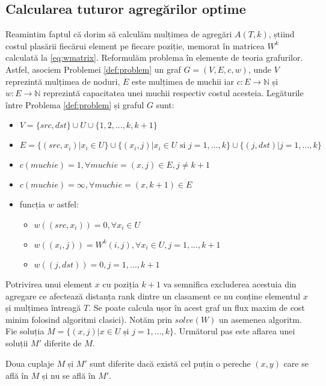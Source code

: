 \subsection{Calcularea tuturor agregărilor optime}
Reamintim faptul că dorim să calculăm mulțimea de agregări $A(T, k)$, știind costul plasării 
fiecărui element pe fiecare poziție, memorat în matricea $W^k$ calculată la \eqref{eq:wmatrix}. 
Reformulăm problema în elemente de teoria grafurilor. Astfel, asociem Problemei \ref{def:problem} 
un graf $G = (V, E, c, w)$, unde $V$ reprezintă mulțimea de noduri, $E$ este mulțimea de muchii iar
$c \colon E \to \mathbb{N}$ și $w \colon E \to \mathbb{N}$ reprezintă capacitatea unei muchii
respectiv costul acesteia. Legăturile între Problema \ref{def:problem} și graful $G$ sunt:
\begin{itemize}
  \item $V = \{src, dst\} \cup U \cup \{1, 2,..., k, k+1\}$
  \item $E = \{(src, x_i) | x_i \in U\} \cup \{(x_i, j) | x_i \in U \text{ si } j = 1,...,k\} \cup 
    \{(j, dst) | j = 1,...,k\}$  
  \item $c(muchie) = 1, \forall muchie = (x, j) \in E, j \neq k+1$
  \item $c(muchie) = \infty, \forall muchie = (x, k+1) \in E$
  \item funcția $w$ astfel:
  \begin{itemize}
    \item $w((src, x_i)) = 0, \forall x_i \in U$
    \item $w((x_i, j)) = W^k(i, j), \forall x_i \in U, j = 1,...,k+1$
    \item $w((j, dst)) = 0, j = 1,...,k+1$
  \end{itemize}
\end{itemize}

Potrivirea unui element $x$ cu poziția $k+1$ va semnifica excluderea acestuia din agregare ce 
afectează distanța rank dintre un clasament ce nu conține elementul $x$ și mulțimea întreagă $T$.
Se poate calcula ușor în acest graf un flux maxim de cost minim folosind algoritmi clasici\cite{flowassignment}).
Notăm prin $solve(W)$ un asemenea algoritm.
Fie soluția $M = \{(x, j) | x \in U \text{ și } j = 1,...,k\}$. Următorul pas este aflarea unei
soluții $M'$ diferite de $M$.

\begin{proposition}
Doua cuplaje $M$ și $M'$ sunt diferite dacă există cel puțin o pereche $(x, y)$ care se află în $M$
și nu se află în $M'$.
\end{proposition}

